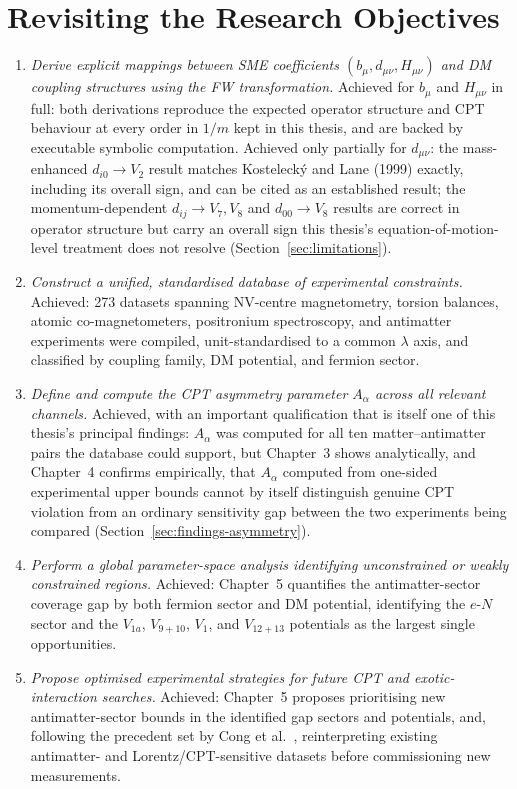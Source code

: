 \documentclass[main]{subfiles}
\begin{document}
\section{Revisiting the Research Objectives}

\begin{enumerate}
  \item \emph{Derive explicit mappings between SME coefficients
    $(b_\mu, d_{\mu\nu}, H_{\mu\nu})$ and DM coupling structures using the
    FW transformation.} Achieved for $b_\mu$ and $H_{\mu\nu}$ in full: both
    derivations reproduce the expected operator structure and CPT
    behaviour at every order in $1/m$ kept in this thesis, and are backed
    by executable symbolic computation. Achieved only partially for
    $d_{\mu\nu}$: the mass-enhanced $d_{i0}\to V_2$ result matches
    Kostelecký and Lane (1999) exactly, including its overall sign, and can
    be cited as an established result; the momentum-dependent $d_{ij}\to
    V_7,V_8$ and $d_{00}\to V_8$ results are correct in operator structure
    but carry an overall sign this thesis's equation-of-motion-level
    treatment does not resolve (Section~\ref{sec:limitations}).
  \item \emph{Construct a unified, standardised database of experimental
    constraints.} Achieved: 273 datasets spanning NV-centre magnetometry,
    torsion balances, atomic co-magnetometers, positronium spectroscopy,
    and antimatter experiments were compiled, unit-standardised to a common
    $\lambda$ axis, and classified by coupling family, DM potential, and
    fermion sector.
  \item \emph{Define and compute the CPT asymmetry parameter $A_\alpha$
    across all relevant channels.} Achieved, with an important
    qualification that is itself one of this thesis's principal findings:
    $A_\alpha$ was computed for all ten matter--antimatter pairs the
    database could support, but Chapter~3 shows analytically, and
    Chapter~4 confirms empirically, that $A_\alpha$ computed from one-sided
    experimental upper bounds cannot by itself distinguish genuine CPT
    violation from an ordinary sensitivity gap between the two experiments
    being compared (Section~\ref{sec:findings-asymmetry}).
  \item \emph{Perform a global parameter-space analysis identifying
    unconstrained or weakly constrained regions.} Achieved: Chapter~5
    quantifies the antimatter-sector coverage gap by both fermion sector
    and DM potential, identifying the $e$-$N$ sector and the
    $V_{1a}$, $V_{9+10}$, $V_1$, and $V_{12+13}$ potentials as the largest
    single opportunities.
  \item \emph{Propose optimised experimental strategies for future CPT and
    exotic-interaction searches.} Achieved: Chapter~5 proposes prioritising
    new antimatter-sector bounds in the identified gap sectors and
    potentials, and, following the precedent set by Cong et
    al.~\cite{Cong2025}, reinterpreting existing antimatter- and
    Lorentz/CPT-sensitive datasets before commissioning new measurements.
\end{enumerate}
\end{document}
